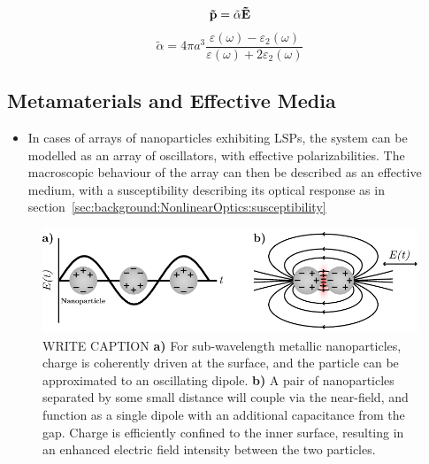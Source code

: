 \begin{equation}\label{eq:Plasmonics:LSPdipole}
    {\bf{\tilde p}} = {{\tilde \alpha }}{\bf{\tilde E}}
\end{equation}
\begin{equation}\label{eq:Plasmonics:LSPalphaSphere}
    {\tilde \alpha } = 4\pi a^3 \frac{\varepsilon (\omega) - \varepsilon_2 (\omega)}{\varepsilon (\omega) + 2\varepsilon_2 (\omega)}
\end{equation}

\subsection{Metamaterials and Effective Media}
\begin{itemize}
    \item In cases of arrays of nanoparticles exhibiting LSPs, the system can be modelled as an array of oscillators, with effective polarizabilities. The macroscopic behaviour of the array can then be described as an effective medium, with a susceptibility describing its optical response as in section~\ref{sec:background:NonlinearOptics:susceptibility}
\end{itemize}

\begin{figure}[htb!]
    \centering
    \includegraphics[scale=1.0]{./figures/background/plasmonics/lsp.pdf}
    \caption{\label{fig:background:Plasmonics:LSP} WRITE CAPTION \textbf{a)} For sub-wavelength metallic nanoparticles, charge is coherently driven at the surface, and the particle can be approximated to an oscillating dipole. \textbf{b)} A pair of nanoparticles separated by some small distance will couple via the near-field, and function as a single dipole with an additional capacitance from the gap. Charge is efficiently confined to the inner surface, resulting in an enhanced electric field intensity between the two particles.}
\end{figure}


